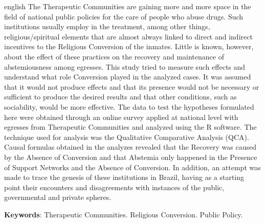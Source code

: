 \documentclass[
	12pt,				%
	oneside,			%
	a4paper,			%
	sumario=tradicional,
	english,			%
	brazil				%
	]{abntex2}
\begin{document}
\begin{resumo}[Abstract]
	\SingleSpacing
	\begin{otherlanguage*}{english}
		The Therapeutic Communities are gaining more and more space in the field of national public policies for the care of people who abuse drugs. Such institutions usually employ in the treatment, among other things, religious/spiritual elements that are almost always linked to direct and indirect incentives to the Religious Conversion of the inmates. Little is known, however, about the effect of these practices on the recovery and maintenance of abstemiousness among egresses. This study tried to measure such effects and understand what role Conversion played in the analyzed cases. It was assumed that it would not produce effects and that its presence would not be necessary or sufficient to produce the desired results and that other conditions, such as sociability, would be more effective. The data to test the hypotheses formulated here were obtained through an online survey applied at national level with egresses from Therapeutic Communities and analyzed using the R software. The technique used for analysis was the Qualitative Comparative Analysis (QCA). Causal formulas obtained in the analyzes revealed that the Recovery was caused by the Absence of Conversion and that Abstemia only happened in the Presence of Support Networks and the Absence of Conversion. In addition, an attempt was made to trace the genesis of these institutions in Brazil, having as a starting point their encounters and disagreements with instances of the public, governmental and private spheres.
		
		\textbf{Keywords}:
	      Therapeutic Communities.
        Religious Conversion.
        Public Policy.
    	\end{otherlanguage*}
\end{resumo}
% 
%
%  
\end{document}
